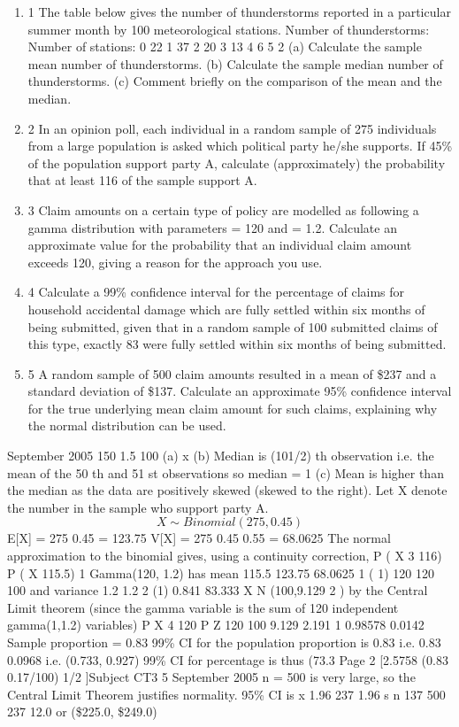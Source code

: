 \documentclass[a4paper,12pt]{article}
\begin{document}

\begin{enumerate}
\item 1
The table below gives the number of thunderstorms reported in a particular summer
month by 100 meteorological stations.
Number of thunderstorms:
Number of stations:
0
22
1
37
2
20
3
13
4
6
5
2
(a) Calculate the sample mean number of thunderstorms.
(b) Calculate the sample median number of thunderstorms.
(c) Comment briefly on the comparison of the mean and the median.
\item 
2 In an opinion poll, each individual in a random sample of 275 individuals from a large population is asked which political party he/she supports. If 45\% of the population
support party A, calculate (approximately) the probability that at least 116 of the sample support A.
\item 
3 Claim amounts on a certain type of policy are modelled as following a gamma distribution with parameters = 120 and = 1.2.
Calculate an approximate value for the probability that an individual claim amount exceeds 120, giving a reason for the approach you use.
\item 
4 Calculate a 99\% confidence interval for the percentage of claims for household accidental damage which are fully settled within six months of being submitted, given
that in a random sample of 100 submitted claims of this type, exactly 83 were fully settled within six months of being submitted.
\item 
5 A random sample of 500 claim amounts resulted in a mean of \$237 and a standard deviation of \$137.
Calculate an approximate 95\% confidence interval for the true underlying mean claim amount for such claims, explaining why the normal distribution can be used.

\end{enumerate}
September 2005
150
1.5
100
(a) x
(b) Median is (101/2) th observation i.e. the mean of the 50 th and 51 st observations
so median = 1
(c) Mean is higher than the median as the data are positively skewed (skewed to
the right).
Let X denote the number in the sample who support party A.
\[X \sim Binomial(275, 0.45)\]
E[X] = 275 0.45 = 123.75
V[X] = 275 0.45 0.55 = 68.0625
The normal approximation to the binomial gives, using a continuity correction,
P ( X
3
116)
P ( X
115.5) 1
Gamma(120, 1.2) has mean
115.5 123.75
68.0625
1
( 1)
120
120
100 and variance
1.2
1.2 2
(1) 0.841
83.333
X N (100,9.129 2 ) by the Central Limit theorem (since the gamma variable is the sum of 120 independent gamma(1,1.2) variables)
P X
4
120
P Z
120 100
9.129
2.191
1 0.98578 0.0142
Sample proportion = 0.83
99\% CI for the population proportion is 0.83
i.e. 0.83 0.0968 i.e. (0.733, 0.927)
99\% CI for percentage is thus (73.3%
Page 2
[2.5758
(0.83 0.17/100) 1/2 ]Subject CT3 %
5
September 2005
n = 500 is very large, so the Central Limit Theorem justifies normality.
95\% CI is x 1.96
237 1.96
s
n
137
500
237 12.0 or (\$225.0, \$249.0)
\end{document}
